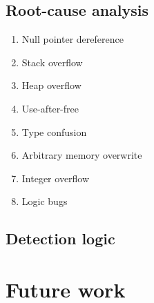 \documentclass{report}
\begin{document}
\subsection{Root-cause analysis}


\begin{enumerate}
    \item Null pointer dereference
    \item Stack overflow
    \item Heap overflow
    \item Use-after-free
    \item Type confusion
    \item Arbitrary memory overwrite
    \item Integer overflow
    \item Logic bugs
\end{enumerate}

\subsection{Detection logic}

\section{Future work}
\end{document}
